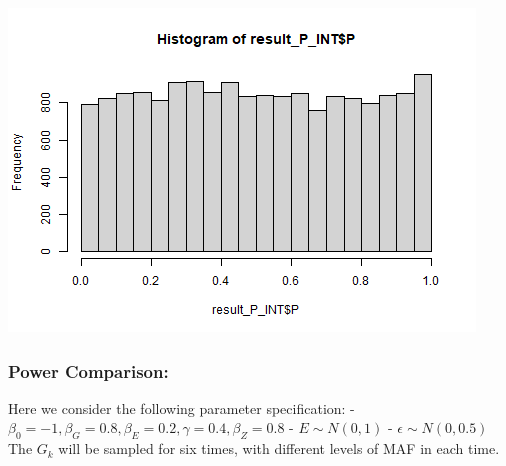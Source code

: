 \documentclass[
]{article}
\newenvironment{Shaded}{\begin{snugshade}}{\end{snugshade}}
\newcommand{\DataTypeTok}[1]{\textcolor[rgb]{0.13,0.29,0.53}{#1}}
\newcommand{\DecValTok}[1]{\textcolor[rgb]{0.00,0.00,0.81}{#1}}
\newcommand{\KeywordTok}[1]{\textcolor[rgb]{0.13,0.29,0.53}{\textbf{#1}}}
\newcommand{\NormalTok}[1]{#1}
\newcommand{\OperatorTok}[1]{\textcolor[rgb]{0.81,0.36,0.00}{\textbf{#1}}}
\begin{document}
\begin{Shaded}
\end{Shaded}

\includegraphics{stats-gene-research-progress-v8_files/figure-latex/unnamed-chunk-7-3.png}

\clearpage

\hypertarget{power-comparison-1}{%
\subsubsection{Power Comparison:}\label{power-comparison-1}}

Here we consider the following parameter specification: -
\(\beta_0= -1, \beta_G=0.8, \beta_E= 0.2,\gamma=0.4, \beta_Z=0.8\) -
\(E \sim N(0,1)\) - \(\epsilon \sim N(0,0.5)\) The \(G_k\) will be
sampled for six times, with different levels of MAF in each time.
\end{document}
